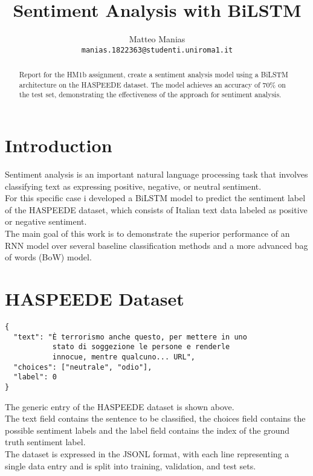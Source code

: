 \documentclass[11pt,a4paper]{article}
\title{Sentiment Analysis with BiLSTM}
\author{Matteo Manias \\ 
    \texttt{manias.1822363@studenti.uniroma1.it}}
\date{}
\begin{document}
\maketitle

\begin{abstract}
Report for the HM1b assignment, create a sentiment analysis model using a BiLSTM architecture on the HASPEEDE dataset. The model achieves an accuracy of 70\% on the test set, demonstrating the effectiveness of the approach for sentiment analysis.
\end{abstract}

\section{Introduction}
Sentiment analysis is an important natural language processing task that involves classifying text as expressing positive,
negative, or neutral sentiment.
\\ For this specific case i developed a BiLSTM model to predict the sentiment label of the HASPEEDE dataset, which consists of Italian text data labeled as positive or negative sentiment.
\\ The main goal of this work is to demonstrate the superior performance of an RNN model over
several baseline classification methods and a more advanced bag of words (BoW) model.



\section{HASPEEDE Dataset}
\begin{adjustbox}{width=0.5\columnwidth}
\begin{minipage}{\linewidth}
\begin{verbatim}
{
  "text": "È terrorismo anche questo, per mettere in uno 
           stato di soggezione le persone e renderle 
           innocue, mentre qualcuno... URL",
  "choices": ["neutrale", "odio"],
  "label": 0
}
\end{verbatim}
\end{minipage}
\end{adjustbox}

The generic entry of the HASPEEDE dataset is shown above.
\\The text field contains the sentence to be classified, the choices field contains the possible sentiment labels
and the label field contains the index of the ground truth sentiment label.
\\The dataset is expressed in the JSONL format, with each line representing a single data entry and is split into training, validation, and test sets.
\end{document}
